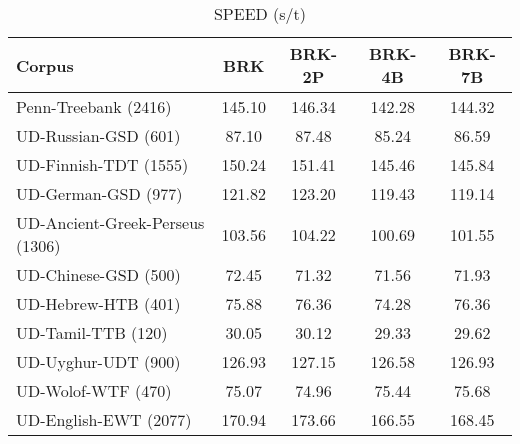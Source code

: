 \begin{table}[h]
    \centering
    \caption{SPEED (s/t)}
    \label{tab:speed}
    \begin{tabular}{lcccc}
        \hline
        \textbf{Corpus}                 & \textbf{BRK} & \textbf{BRK-2P} & \textbf{BRK-4B} & \textbf{BRK-7B} \\ 
        \hline
        Penn-Treebank (2416)            & 145.10       & 146.34          & 142.28          & 144.32          \\
        UD-Russian-GSD (601)            & 87.10        & 87.48           & 85.24           & 86.59           \\
        UD-Finnish-TDT (1555)           & 150.24       & 151.41          & 145.46          & 145.84          \\
        UD-German-GSD (977)             & 121.82       & 123.20          & 119.43          & 119.14          \\
        UD-Ancient-Greek-Perseus (1306) & 103.56       & 104.22          & 100.69          & 101.55          \\
        UD-Chinese-GSD (500)            & 72.45        & 71.32           & 71.56           & 71.93           \\
        UD-Hebrew-HTB (401)             & 75.88        & 76.36           & 74.28           & 76.36           \\  
        UD-Tamil-TTB (120)              & 30.05        & 30.12           & 29.33           & 29.62           \\
        UD-Uyghur-UDT (900)             & 126.93       & 127.15          & 126.58          & 126.93          \\
        UD-Wolof-WTF (470)              & 75.07        & 74.96           & 75.44           & 75.68           \\
        UD-English-EWT (2077)           & 170.94       & 173.66          & 166.55          & 168.45          \\
        \hline 
    \end{tabular}
\end{table}


